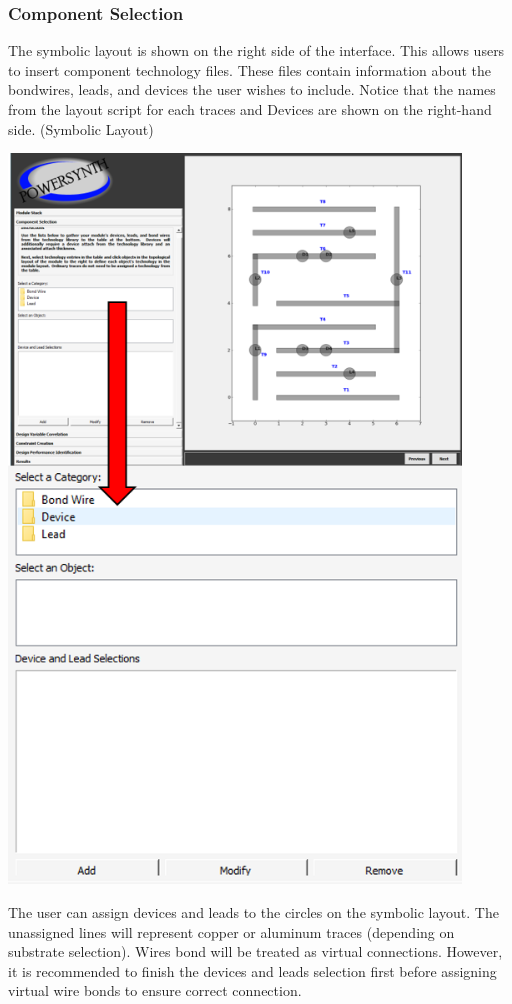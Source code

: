 \documentclass[11pt]{article}
\begin{document}
\subsubsection{Component Selection}
\label{sec-2-3-3}

The symbolic layout is shown on the right side of the interface. This allows users to insert component technology files. These files contain information about the bondwires, leads, and devices the user wishes to include. Notice that the names from the layout script for each traces and Devices are shown on the right-hand side. (Symbolic Layout)

\begin{center}
\includegraphics[width=12cm]{./figs/07_Components.png}
\end{center}

The user can assign devices and leads to the circles on the symbolic layout. The unassigned lines will represent copper or aluminum traces (depending on substrate selection). Wires bond will be treated as virtual connections. However, it is recommended to finish the devices and leads selection first before assigning virtual wire bonds to ensure correct connection.
\end{document}
